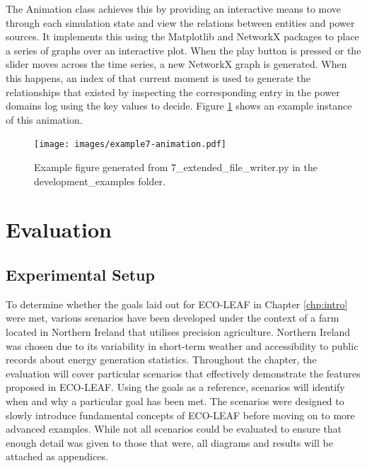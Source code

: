 \documentclass{l4proj}
\begin{document}
The Animation class achieves this by providing an interactive means to move through each simulation state and view the relations between entities and power sources.
It implements this using the Matplotlib and NetworkX packages to place a series of graphs over an interactive plot.
When the play button is pressed or the slider moves across the time series, a new NetworkX graph is generated.
When this happens, an index of that current moment is used to generate the relationships that existed by inspecting the corresponding entry in the power domains log using the key values to decide.
Figure \ref{fig:dev-example7-animation} shows an example instance of this animation.
\begin{figure}[h]
    \centering
    \texttt{[image: images/example7-animation.pdf]}
    ~
    \caption{Example figure generated from 7\_extended\_file\_writer.py in the development\_examples folder.}
    \label{fig:dev-example7-animation}
\end{figure}


\chapter{Evaluation} \label{chp:evaluation}

\section{Experimental Setup}\label{eval:sec:scenarios}
To determine whether the goals laid out for ECO-LEAF in Chapter \ref{chp:intro} were met, various scenarios have been developed under the context of a farm located in Northern Ireland that utilises precision agriculture.
Northern Ireland was chosen due to its variability in short-term weather and accessibility to public records about energy generation statistics.
Throughout the chapter, the evaluation will cover particular scenarios that effectively demonstrate the features proposed in ECO-LEAF.
Using the goals as a reference, scenarios will identify when and why a particular goal has been met.
The scenarios were designed to slowly introduce fundamental concepts of ECO-LEAF before moving on to more advanced examples.
While not all scenarios could be evaluated to ensure that enough detail was given to those that were, all diagrams and results will be attached as appendices.
\end{document}
